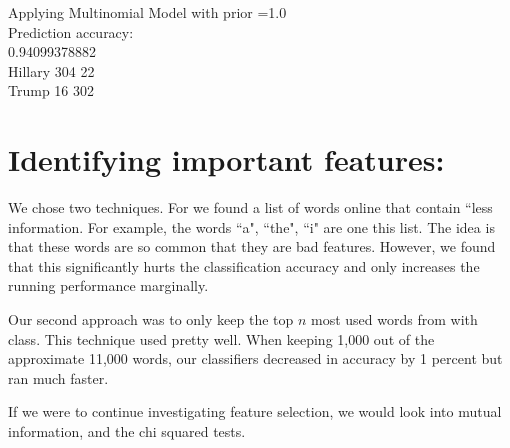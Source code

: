 \documentclass[]{article}
\begin{document}
Applying Multinomial Model with prior =1.0\\
Prediction accuracy:\\
0.94099378882\\
Hillary     304 22 \\
Trump       16  302

\section{Identifying important features:}

We chose two techniques. For we found a list of words online that contain ``less information. For example, the words ``a", ``the", ``i" are one this list. The idea is that these words are so common that they are bad features. However, we found that this significantly hurts the classification accuracy and only increases the running performance marginally. 

Our second approach was to only keep the top $n$ most used words from with class. This technique used pretty well. When keeping 1,000 out of the approximate 11,000 words, our classifiers decreased in accuracy by 1 percent but ran much faster. 

If we were to continue investigating feature selection, we would look into mutual information, and the chi squared tests. 
\end{document}
